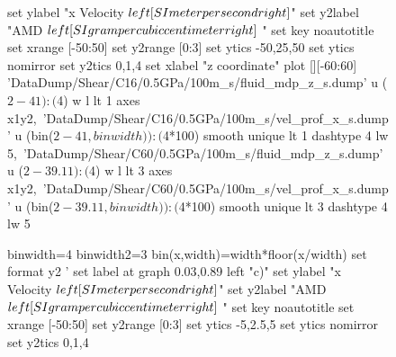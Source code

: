 \documentclass[5p]{elsarticle}
\begin{document}
\begin{figure}[htp]
\begin{center}
\begin{gnuplot}[terminal=epslatex, terminaloptions={size \SERFigwidth cm, \SERFigheight cm color solid}]
			set ylabel "x Velocity $\\left[ \\SI{}{\\meter\\per\\second} \\right]$"
			set y2label "AMD $\\left[ \\SI{}{\\gram\\per\\cubic\\centi\\meter} \\right]$ "
			set key noautotitle
			set xrange [-50:50]
			set y2range [0:3]
			set ytics  -50,25,50
			set ytics nomirror
			set y2tics 0,1,4
			set xlabel "z coordinate"  
			plot  	[][-60:60]  'DataDump/Shear/C16/0.5GPa/100m_s/fluid_mdp_z_s.dump' u ($2-41):($4) w l  lt 1 axes x1y2,\ 								
				              'DataDump/Shear/C16/0.5GPa/100m_s/vel_prof_x_s.dump'  u (bin($2-41,binwidth)):($4*100) smooth unique lt 1 dashtype 4  lw 5,\ 	
                             		    'DataDump/Shear/C60/0.5GPa/100m_s/fluid_mdp_z_s.dump' u ($2-39.11):($4) w l  lt 3  axes x1y2,\
				              'DataDump/Shear/C60/0.5GPa/100m_s/vel_prof_x_s.dump'  u (bin($2-39.11,binwidth)):($4*100) smooth unique lt 3 dashtype 4  lw 5
		\end{gnuplot}
		\begin{gnuplot}[terminal=epslatex, terminaloptions={size \SERFigwidth cm, \SERFigheight cm color solid}]
			binwidth=4
			binwidth2=3
			bin(x,width)=width*floor(x/width)
			set format y2 '%
			set label at graph 0.03,0.89 left "c)"
			set ylabel "x Velocity $\\left[ \\SI{}{\\meter\\per\\second} \\right]$"
			set y2label "AMD $\\left[ \\SI{}{\\gram\\per\\cubic\\centi\\meter} \\right]$ "
			set key noautotitle
			set xrange [-50:50]
			set y2range [0:3]
			set ytics  -5,2.5,5
			set ytics nomirror
			set y2tics 0,1,4

\end{gnuplot}
\end{center}
\end{figure}
\end{document}
